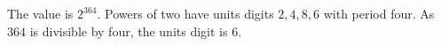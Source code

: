 The value is $2^{364}$. Powers of two have units digits $2,4,8,6$ with period four. As $364$ is divisible by four, the units digit is $\boxed6$.
